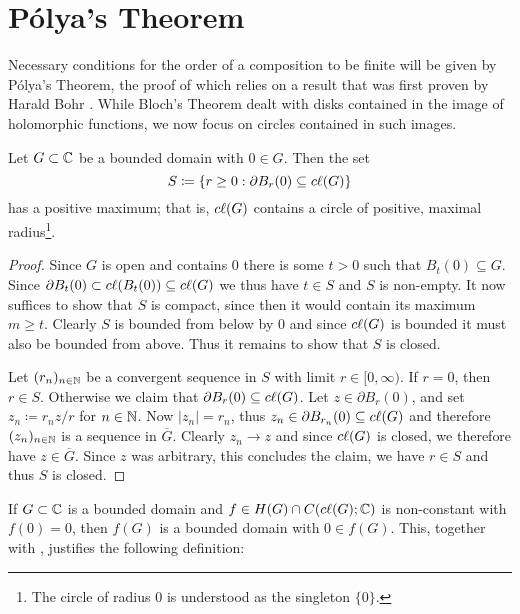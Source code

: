 \section{Pólya's Theorem}
\label{sec:polyas-theorem}

Necessary conditions for the order of a composition to be finite will be given by Pólya's Theorem, the proof of which relies on a result that was first proven by Harald Bohr \cite{segal-complex-analysis}. While Bloch's Theorem dealt with disks contained in the image of holomorphic functions, we now focus on circles contained in such images.

\begin{proposition} \label{prop:existence-circle-maximal-radius}
    Let $G \subset \mathbb{C}$ be a bounded domain with $0 \in G$. Then the set
    \begin{equation} \label{eq:set-circle-maximal-radius}
        S \coloneqq \{ r \geq 0 : \partial B_r(0) \subseteq c\ell({G}) \}
    \end{equation}
    has a positive maximum; that is, $c\ell({G})$ contains a circle of positive, maximal radius\footnote{The circle of radius $0$ is understood as the singleton $\{ 0 \}$.}.
\end{proposition}

\begin{proof}
    Since $G$ is open and contains $0$ there is some $t > 0$ such that $B_t(0) \subseteq G$. Since $\partial B_t(0) \subset c\ell({B_t(0)}) \subseteq c\ell({G})$ we thus have $t \in S$ and $S$ is non-empty. It now suffices to show that $S$ is compact, since then it would contain its maximum $m \geq t$. Clearly $S$ is bounded from below by $0$ and since $c\ell({G})$ is bounded it must also be bounded from above. Thus it remains to show that $S$ is closed.

    Let $(r_n)_{n \in \mathbb{N}}$ be a convergent sequence in $S$ with limit $r \in [0, \infty)$. If $r = 0$, then $r \in S$. Otherwise we claim that $\partial B_r(0) \subseteq c\ell({G})$. Let $z \in \partial B_r(0)$, and set $z_n \coloneqq r_n z / r$ for $n \in \mathbb{N}$. Now $\vert z_n \vert = r_n$, thus $z_n \in \partial B_{r_n}(0) \subseteq c\ell({G})$ and therefore $(z_n)_{n \in \mathbb{N}}$ is a sequence in $\overline{G}$. Clearly $z_n \to z$ and since $c\ell({G})$ is closed, we therefore have $z \in \overline{G}$. Since $z$ was arbitrary, this concludes the claim, we have $r \in S$ and thus $S$ is closed.
\end{proof}

If $G \subset \mathbb{C}$ is a bounded domain and $f \in H(G) \cap C(c\ell({G}); \mathbb{C})$ is non-constant with $f(0) = 0$, then $f(G)$ is a bounded domain with $0 \in f(G)$. This, together with , justifies the following definition:

